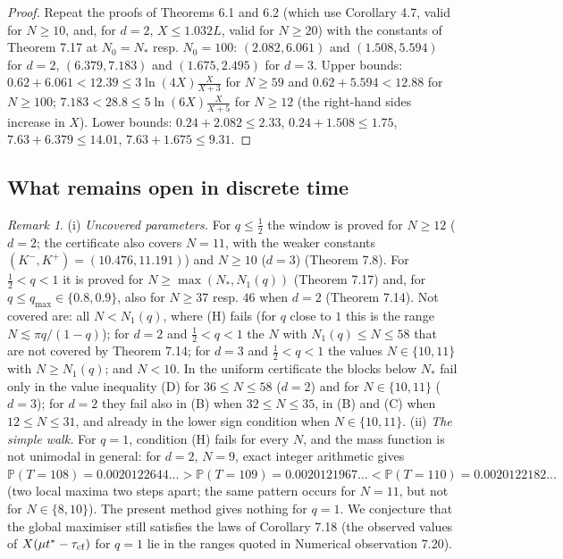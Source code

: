 \documentclass[11pt,a4paper]{article}
\theoremstyle{definition}
\theoremstyle{remark}
\newtheorem{remark}[theorem]{Remark}
\begin{document}
\begin{proof}
Repeat the proofs of Theorems 6.1 and 6.2 (which use Corollary 4.7, valid for $N\ge10$, and, for $d=2$, $X\le1.032L$, valid for $N\ge20$) with the constants of Theorem 7.17 at $N_0=N_*$ resp. $N_0=100$: $(2.082,6.061)$ and $(1.508,5.594)$ for $d=2$, $(6.379,7.183)$ and $(1.675,2.495)$ for $d=3$. Upper bounds: $0.62+6.061<12.39\le3\ln(4X)\frac{X}{X+3}$ for $N\ge59$ and $0.62+5.594<12.88$ for $N\ge100$; $7.183<28.8\le5\ln(6X)\frac{X}{X+5}$ for $N\ge12$ (the right-hand sides increase in $X$). Lower bounds: $0.24+2.082\le2.33$, $0.24+1.508\le1.75$, $7.63+6.379\le14.01$, $7.63+1.675\le9.31$.
\end{proof}

\subsection{What remains open in discrete time}

\begin{remark}
(i) \emph{Uncovered parameters.} For $q\le\frac12$ the window is proved for $N\ge12$ ($d=2$; the certificate also covers $N=11$, with the weaker constants $(K^-,K^+)=(10.476,11.191)$) and $N\ge10$ ($d=3$) (Theorem 7.8). For $\frac12<q<1$ it is proved for $N\ge\max(N_*,N_1(q))$ (Theorem 7.17) and, for $q\le q_{\max}\in\{0.8,0.9\}$, also for $N\ge37$ resp. $46$ when $d=2$ (Theorem 7.14). Not covered are: all $N<N_1(q)$, where (H) fails (for $q$ close to $1$ this is the range $N\lesssim\pi q/(1-q)$); for $d=2$ and $\frac12<q<1$ the $N$ with $N_1(q)\le N\le58$ that are not covered by Theorem 7.14; for $d=3$ and $\frac12<q<1$ the values $N\in\{10,11\}$ with $N\ge N_1(q)$; and $N<10$. In the uniform certificate the blocks below $N_*$ fail only in the value inequality (D) for $36\le N\le58$ ($d=2$) and for $N\in\{10,11\}$ ($d=3$); for $d=2$ they fail also in (B) when $32\le N\le35$, in (B) and (C) when $12\le N\le31$, and already in the lower sign condition when $N\in\{10,11\}$. (ii) \emph{The simple walk.} For $q=1$, condition (H) fails for every $N$, and the mass function is not unimodal in general: for $d=2$, $N=9$, exact integer arithmetic gives $\mathbb P(T=108)=0.0020122644\ldots>\mathbb P(T=109)=0.0020121967\ldots<\mathbb P(T=110)=0.0020122182\ldots$ (two local maxima two steps apart; the same pattern occurs for $N=11$, but not for $N\in\{8,10\}$). The present method gives nothing for $q=1$. We conjecture that the global maximiser still satisfies the laws of Corollary 7.18 (the observed values of $X(\mu t^*-\tau_{\rm cf})$ for $q=1$ lie in the ranges quoted in Numerical observation 7.20).
\end{remark}
\end{document}
